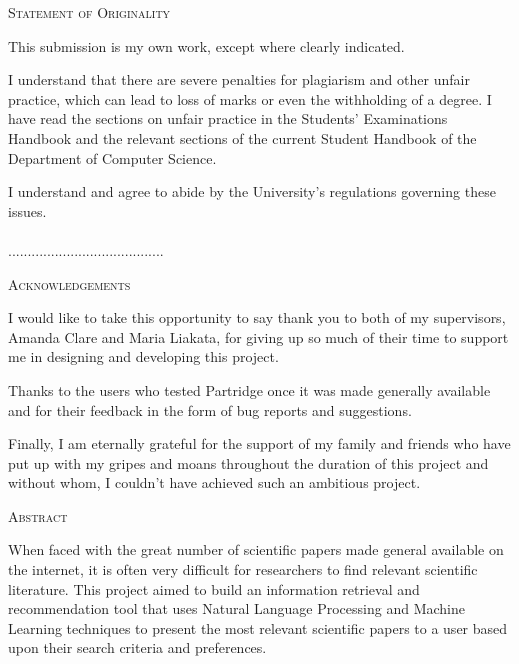 \documentclass[11pt,a4paper,oneside]{book}
\begin{document}



\setlength{\parindent}{0pt}
\setlength{\parskip}{1.5ex plus 0.5ex minus 0.2ex}



\thispagestyle{plain}

\begin{center}
\textsc{\large Statement of Originality}
\end{center}

This submission is my own work, except where clearly indicated.  

I understand that there are severe penalties for plagiarism and other unfair
practice, which can lead to loss of marks or even the withholding of a degree.
I have read the sections on unfair practice in the Students’ Examinations
Handbook and the relevant sections of the current Student Handbook of the
Department of Computer Science.  

I understand and agree to abide by the University’s regulations governing these
issues.\\\\

........................................

\pagebreak
\thispagestyle{plain}

\begin{center}
\textsc{\large Acknowledgements}
\end{center}

I would like to take this opportunity to say thank you to both of my
supervisors, Amanda Clare and Maria Liakata, for giving up so much of their
time to support me in designing and developing this project. 

Thanks to the users who tested Partridge once it was made generally available
and for their feedback in the form of bug reports and suggestions.

Finally, I am eternally grateful for the support of my family and friends who
have put up with my gripes and moans throughout the duration of this project
and without whom, I couldn't have achieved such an ambitious project.

\pagebreak
\thispagestyle{plain}


\begin{center}
\textsc{\large Abstract}
\end{center}

When faced with the great number of scientific papers made general available on
the internet, it is often very difficult for researchers to find relevant
scientific literature. This project aimed to build an information retrieval and
recommendation tool that uses Natural Language Processing and Machine Learning
techniques to present the most relevant scientific papers to a user based upon
their search criteria and preferences.
\end{document}
